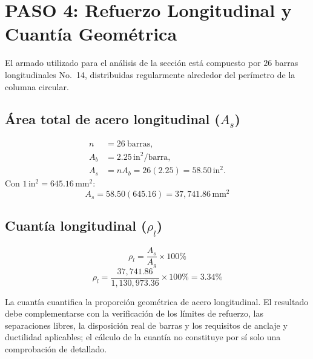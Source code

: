 \documentclass[11pt,a4paper]{article}
\begin{document}
\section{PASO 4: Refuerzo Longitudinal y Cuantía Geométrica}

El armado utilizado para el análisis de la sección está compuesto por
$26$ barras longitudinales No.~14, distribuidas regularmente alrededor
del perímetro de la columna circular.

\subsection{Área total de acero longitudinal ($A_s$)}
\begin{align*}
n&=26\ \text{barras},\\
A_b&=2.25\,\mathrm{in}^2/\text{barra},\\
A_s&=n A_b=26(2.25)=58.50\,\mathrm{in}^2.
\end{align*}
Con $1\,\mathrm{in}^2=645.16\,\mathrm{mm}^2$:
\begin{equation*}
A_s=58.50(645.16)=\boxed{37{,}741.86\,\mathrm{mm}^2}
\end{equation*}

\subsection{Cuantía longitudinal ($\rho_l$)}
\begin{equation*}
\rho_l=\frac{A_s}{A_g}\times100\%
\end{equation*}
\begin{equation*}
\rho_l=\frac{37{,}741.86}{1{,}130{,}973.36}\times100\%
  =\boxed{3.34\%}
\end{equation*}

La cuantía cuantifica la proporción geométrica de acero longitudinal. El
resultado debe complementarse con la verificación de los límites de refuerzo,
las separaciones libres, la disposición real de barras y los requisitos de
anclaje y ductilidad aplicables; el cálculo de la cuantía no constituye por
sí solo una comprobación de detallado.
\end{document}
